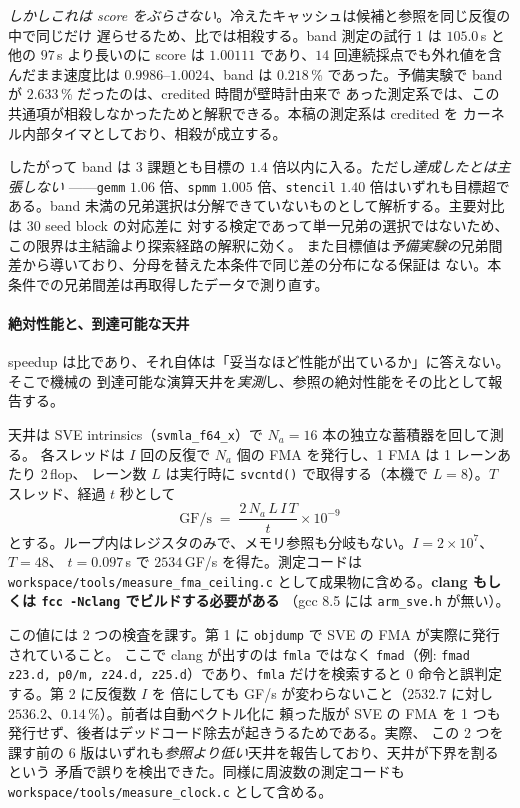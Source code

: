 \documentclass[conference,letterpaper]{IEEEtran}
\begin{document}
\emph{しかしこれは score をぶらさない}。冷えたキャッシュは候補と参照を同じ反復の中で同じだけ
遅らせるため、比では相殺する。band 測定の試行 1 は $105.0$\,s と他の $97$\,s より長いのに score は
$1.00111$ であり、$14$ 回連続採点でも外れ値を含んだまま速度比は $0.9986$--$1.0024$、band は
$0.218$\,\% であった。予備実験で band が $2.633$\,\% だったのは、credited 時間が壁時計由来で
あった測定系では、この共通項が相殺しなかったためと解釈できる。本稿の測定系は credited を
カーネル内部タイマとしており、相殺が成立する。

したがって band は 3 課題とも目標の $1.4$ 倍以内に入る。ただし\emph{達成したとは主張しない}
——\texttt{gemm} $1.06$ 倍、\texttt{spmm} $1.005$ 倍、\texttt{stencil} $1.40$ 倍はいずれも目標超で
ある。band 未満の兄弟選択は分解できていないものとして解析する。主要対比は 30 seed block の対応差に
対する検定であって単一兄弟の選択ではないため、この限界は主結論より探索経路の解釈に効く。
また目標値は\emph{予備実験の}兄弟間差から導いており、分母を替えた本条件で同じ差の分布になる保証は
ない。本条件での兄弟間差は再取得したデータで測り直す。

\paragraph{絶対性能と、到達可能な天井}
speedup は比であり、それ自体は「妥当なほど性能が出ているか」に答えない。そこで機械の
到達可能な演算天井を\emph{実測}し、参照の絶対性能をその比として報告する。

天井は SVE intrinsics（\texttt{svmla\_f64\_x}）で $N_a=16$ 本の独立な蓄積器を回して測る。
各スレッドは $I$ 回の反復で $N_a$ 個の FMA を発行し、1 FMA は 1 レーンあたり 2\,flop、
レーン数 $L$ は実行時に \texttt{svcntd()} で取得する（本機で $L=8$）。$T$ スレッド、経過 $t$ 秒として
\[
  \mathrm{GF/s} \;=\; \frac{2\,N_a\,L\,I\,T}{t}\times 10^{-9}
\]
とする。ループ内はレジスタのみで、メモリ参照も分岐もない。$I=2\times10^{7}$、$T=48$、
$t=0.097$\,s で $2534$\,GF/s を得た。測定コードは \texttt{workspace/tools/measure\_fma\_ceiling.c}
として成果物に含める。\textbf{clang もしくは \texttt{fcc -Nclang} でビルドする必要がある}
（gcc 8.5 には \texttt{arm\_sve.h} が無い）。

この値には 2 つの検査を課す。第 1 に \texttt{objdump} で SVE の FMA が実際に発行されていること。
ここで clang が出すのは \texttt{fmla} ではなく \texttt{fmad}（例: \texttt{fmad z23.d, p0/m,
z24.d, z25.d}）であり、\texttt{fmla} だけを検索すると 0 命令と誤判定する。第 2 に反復数 $I$ を
倍にしても GF/s が変わらないこと（$2532.7$ に対し $2536.2$、$0.14$\,\%）。前者は自動ベクトル化に
頼った版が SVE の FMA を 1 つも発行せず、後者はデッドコード除去が起きうるためである。実際、
この 2 つを課す前の 6 版はいずれも\emph{参照より低い}天井を報告しており、天井が下界を割るという
矛盾で誤りを検出できた。同様に周波数の測定コードも
\texttt{workspace/tools/measure\_clock.c} として含める。
\end{document}
